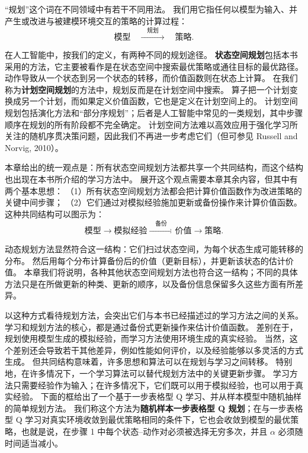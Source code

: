 \documentclass[UTF8, 12pt, fontset=fandol, oneside]{ctexart}
\begin{document}
“规划”这个词在不同领域中有若干不同用法。
我们用它指任何以模型为输入、并产生或改进与被建模环境交互的策略的计算过程：
\[
\text{模型}\quad \xrightarrow{\quad \text{规划}\quad}\quad \text{策略}.
\]

在人工智能中，按我们的定义，有两种不同的规划途径。
\textbf{状态空间规划}包括本书采用的方法，它主要被看作是在状态空间中搜索最优策略或通往目标的最优路径。
动作导致从一个状态到另一个状态的转移，而价值函数则在状态上计算。
在我们称为\textbf{计划空间规划}的方法中，规划反而是在计划空间中搜索。
算子把一个计划变换成另一个计划，而如果定义价值函数，它也是定义在计划空间上的。
计划空间规划包括演化方法和“部分序规划”；后者是人工智能中常见的一类规划，其中步骤顺序在规划的所有阶段都不完全确定。
计划空间方法难以高效应用于强化学习所关注的随机序贯决策问题，因此我们不再进一步考虑它们（但可参见 Russell and Norvig, 2010）。

本章给出的统一观点是：所有状态空间规划方法都共享一个共同结构，而这个结构也出现在本书所介绍的学习方法中。
展开这个观点需要本章其余内容，但其中有两个基本思想：
（1）所有状态空间规划方法都会把计算价值函数作为改进策略的关键中间步骤；
（2）它们通过对模拟经验施加更新或备份操作来计算价值函数。
这种共同结构可以图示为：
\[
\text{模型}
\longrightarrow
\text{模拟经验}
\xrightarrow{\quad \text{备份}\quad}
\text{价值}
\longrightarrow
\text{策略}.
\]

动态规划方法显然符合这一结构：它们扫过状态空间，为每个状态生成可能转移的分布。
然后用每个分布计算备份后的价值（更新目标），并更新该状态的估计价值。
本章我们将说明，各种其他状态空间规划方法也符合这一结构；不同的具体方法只是在所做更新的种类、更新的顺序，以及备份信息保留多久这些方面有所差异。

以这种方式看待规划方法，会突出它们与本书已经描述过的学习方法之间的关系。
学习和规划方法的核心，都是通过备份式更新操作来估计价值函数。
差别在于，规划使用模型生成的模拟经验，而学习方法使用环境生成的真实经验。
当然，这个差别还会导致若干其他差异，例如性能如何评价，以及经验能够以多灵活的方式生成。
但共同结构意味着，许多思想和算法可以在规划与学习之间转移。
特别地，在许多情况下，一个学习算法可以替代规划方法中的关键更新步骤。
学习方法只需要经验作为输入；在许多情况下，它们既可以用于模拟经验，也可以用于真实经验。
下面的框给出了一个基于一步表格型 Q 学习、并从样本模型中随机抽样的简单规划方法。
我们称这个方法为\textbf{随机样本一步表格型 Q 规划}；在与一步表格型 Q 学习对真实环境收敛到最优策略相同的条件下，它也会收敛到模型的最优策略，也就是说，在步骤 1 中每个状态--动作对必须被选择无穷多次，并且 $\alpha$ 必须随时间适当减小。
\end{document}
